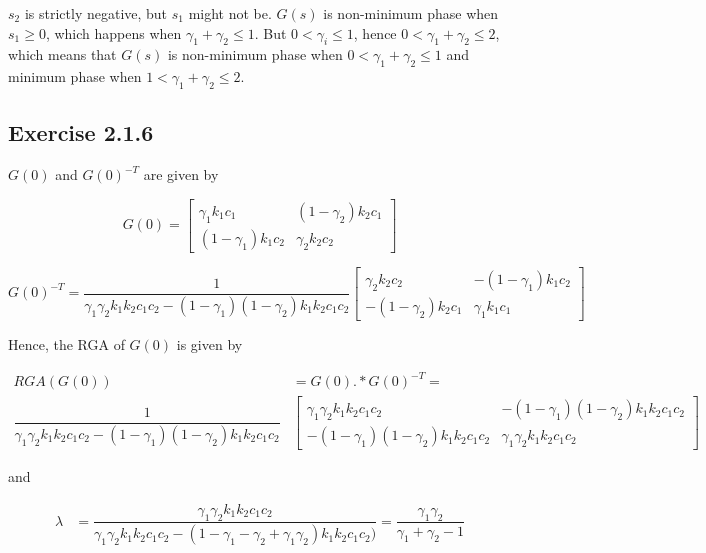 $s_2$ is strictly negative, but $s_1$ might not be. $G(s)$ is non-minimum phase
when $s_1 \geq 0$, which happens when $\gamma_1 + \gamma_2 \leq 1$. But
$0 < \gamma_i \leq 1$, hence $0 < \gamma_1 + \gamma_2 \leq 2$, which means that
$G(s)$ is non-minimum phase when $0 < \gamma_1 + \gamma_2 \leq 1$ and minimum
phase when $1 < \gamma_1 + \gamma_2 \leq 2$.



\subsection*{Exercise 2.1.6}

$G(0)$ and $G(0)^{-T}$ are given by

\[
G(0) =
\begin{bmatrix}
  \gamma_1 k_1 c_1 & (1-\gamma_2)k_2 c_1 \\
  (1-\gamma_1) k_1 c_2 & \gamma_2 k_2 c_2
\end{bmatrix}
\]

\[
G(0)^{-T} =
\dfrac{1}{\gamma_1 \gamma_2 k_1 k_2 c_1 c_2 - (1-\gamma_1) (1-\gamma_2) k_1 k_2 c_1 c_2}
\begin{bmatrix}
  \gamma_2 k_2 c_2 & -(1-\gamma_1) k_1 c_2 \\
  -(1-\gamma_2)k_2 c_1 & \gamma_1 k_1 c_1
\end{bmatrix}
\]

Hence, the RGA of $G(0)$ is given by

\begin{align*}
  RGA(G(0)) &= G(0) .* G(0)^{-T} = \\
  \dfrac{1}{\gamma_1 \gamma_2 k_1 k_2 c_1 c_2 - (1-\gamma_1) (1-\gamma_2) k_1 k_2 c_1 c_2}
  &\begin{bmatrix}
    \gamma_1 \gamma_2 k_1 k_2 c_1 c_2 & - (1-\gamma_1) (1-\gamma_2) k_1 k_2 c_1 c_2 \\
    - (1-\gamma_1) (1-\gamma_2) k_1 k_2 c_1 c_2 & \gamma_1 \gamma_2 k_1 k_2 c_1 c_2
  \end{bmatrix}
\end{align*}

and

\begin{align*}
  \lambda &= \dfrac{\gamma_1 \gamma_2 k_1 k_2 c_1 c_2}{\gamma_1 \gamma_2 k_1 k_2 c_1 c_2 - (1 - \gamma_1 - \gamma_2 + \gamma_1 \gamma_2) k_1 k_2 c_1 c_2)}
          = \dfrac{\gamma_1 \gamma_2}{\gamma_1 + \gamma_2 - 1}
\end{align*}

